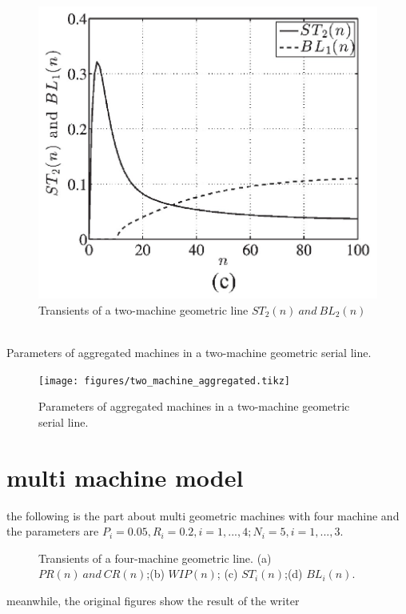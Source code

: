 \begin{figure}[!h]
	\centering
	\includegraphics[width=0.45\linewidth]{figures/st-bl-origin.jpg}
	\caption{Transients of a two-machine geometric line $ST_2(n) \ and\ BL_2(n)$}
	\label{st_bl_origin}
\end{figure}

~\\
Parameters of aggregated machines in a two-machine geometric
serial line.

\begin{figure}[!h]
	\centering
	\texttt{[image: figures/two\_machine\_aggregated.tikz]}
	\caption{Parameters of aggregated machines in a two-machine geometric serial line.}
	\label{two machines aggregated}
\end{figure}

\section{multi machine model}
\noindent the following is the part about multi geometric machines with four machine and the parameters are 
$P_i = 0.05, R_i = 0.2, i = 1,...,4; N_i = 5, i = 1,...,3.$

\begin{figure}[!h]
	\centering
	\caption{Transients of a four-machine geometric line. (a) $PR(n) \ and\ CR(n)$;(b) $WIP(n)$; (c) $ST_i(n)$;(d) $BL_i(n)$.}
	\label{Transients of a four-machine geometric line}
\end{figure}

meanwhile, the original figures show the result of the writer